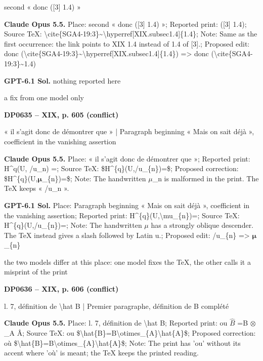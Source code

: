 second « donc ([3] 1.4) »\par
\textbf{Claude Opus 5.5.} Place: second « donc ([3] 1.4) »; Reported print: ([3] 1.4); Source TeX: \textbackslash{}cite\{SGA4-19:3\}\textasciitilde{}\textbackslash{}hyperref[XIX.subsec1.4]\{1.4\}; Note: Same as the first occurrence: the link points to XIX 1.4 instead of 1.4 of [3].; Proposed edit: donc (\textbackslash{}cite\{SGA4-19:3\}\textasciitilde{}\textbackslash{}hyperref[XIX.subsec1.4]\{1.4\}) =\allowbreak > donc (\textbackslash{}cite\{SGA4-19:3\}\textasciitilde{}1.4)\par
\textbf{GPT-6.1 Sol.} nothing reported here\par
a fix from one model only\par
\par\noindent\hypertarget{DP0635}{}\textbf{DP0635 -- XIX, p. 605 (conflict)}\par
« il s'agit donc de démontrer que » | Paragraph beginning « Mais on sait déjà », coefficient in the vanishing assertion\par
\textbf{Claude Opus 5.5.} Place: « il s'agit donc de démontrer que »; Reported print: H\textasciicircum{}q(U, /u\_n) =; Source TeX: \$H\textasciicircum{}\{q\}(U,/u\_\{n\})=\$; Proposed correction: \$H\textasciicircum{}\{q\}(U,\ensuremath{𝛍}\_\{n\})=\$; Note: The handwritten \ensuremath{\mu}\_n is malformed in the print. The TeX keeps « /u\_n ».\par
\textbf{GPT-6.1 Sol.} Place: Paragraph beginning « Mais on sait déjà », coefficient in the vanishing assertion; Reported print: H\textasciicircum{}\{q\}(U,\textbackslash{}mu\_\{n\})=; Source TeX: H\textasciicircum{}\{q\}(U,/u\_\{n\})=; Note: The handwritten \ensuremath{\mu} has a strongly oblique descender. The TeX instead gives a slash followed by Latin u.; Proposed edit: /u\_\{n\} =\allowbreak > \ensuremath{𝛍}\_\{n\}\par
the two models differ at this place: one model fixes the TeX, the other calls it a misprint of the print\par
\par\noindent\hypertarget{DP0636}{}\textbf{DP0636 -- XIX, p. 606 (conflict)}\par
l. 7, définition de \textbackslash{}hat B | Premier paragraphe, définition de B complété\par
\textbf{Claude Opus 5.5.} Place: l. 7, définition de \textbackslash{}hat B; Reported print: ou \ensuremath{\hat{B}} =\allowbreak  B \ensuremath{\otimes}\_A Â; Source TeX: ou \$\textbackslash{}hat\{B\}=\allowbreak B\textbackslash{}otimes\_\{A\}\textbackslash{}hat\{A\}\$; Proposed correction: où \$\textbackslash{}hat\{B\}=\allowbreak B\textbackslash{}otimes\_\{A\}\textbackslash{}hat\{A\}\$; Note: The print has 'ou' without its accent where 'où' is meant; the TeX keeps the printed reading.\par
